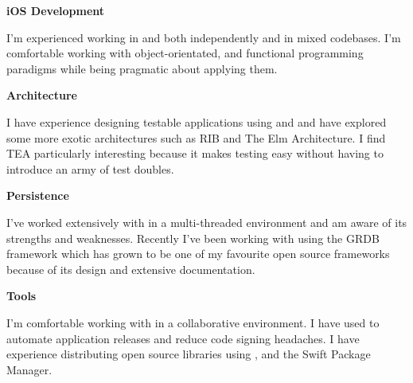 \textbf{iOS Development}

I'm experienced working in  and  both
independently and in mixed codebases. I'm comfortable working with
object-orientated,  and functional programming
paradigms while being pragmatic about applying them.

\smallskip

\textbf{Architecture}

I have experience designing testable applications using  and
 and have explored some more exotic architectures such as RIB and
The Elm Architecture. I find TEA particularly interesting because it makes
testing easy without having to introduce an army of test doubles.

\smallskip

\textbf{Persistence}

I've worked extensively with  in a multi-threaded environment
and am aware of its strengths and weaknesses. Recently I've been working with
 using the GRDB framework which has grown to be one of my
favourite open source frameworks because of its design and extensive
documentation.

\smallskip

\textbf{Tools}

I'm comfortable working with  in a collaborative environment. I have
used  to automate application releases and reduce code signing
headaches. I have experience distributing open source libraries using
,  and the Swift Package Manager.

